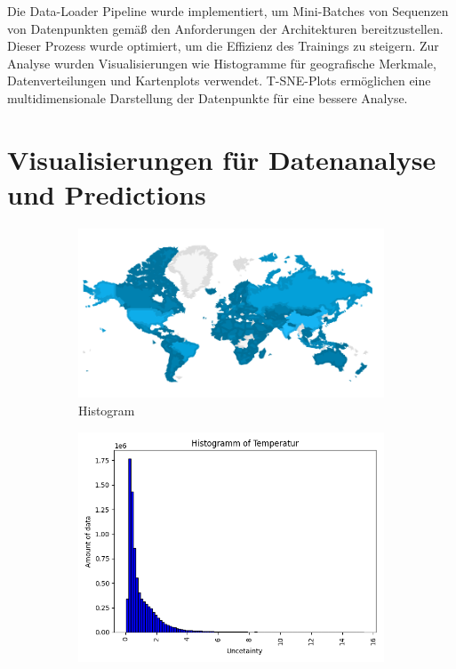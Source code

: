 \documentclass[manuscript,screen,review]{acmart}
\begin{document}
Die Data-Loader Pipeline wurde implementiert, um Mini-Batches von Sequenzen von Datenpunkten gemäß den Anforderungen der Architekturen bereitzustellen. Dieser Prozess wurde optimiert, um die Effizienz des Trainings zu steigern. 
Zur Analyse wurden Visualisierungen wie Histogramme für geografische Merkmale, Datenverteilungen und Kartenplots verwendet. 
T-SNE-Plots ermöglichen eine multidimensionale Darstellung der Datenpunkte für eine bessere Analyse.

\section{Visualisierungen für Datenanalyse und Predictions}

\begin{figure}[htp]
  \centering
  \begin{subfigure}{.45\textwidth}
      \centering
      \includegraphics[width=.8\linewidth]{./histograms/map_plot_data_points}
      \caption{Histogram}
      \label{fig:sub1}
  \end{subfigure}%
  \begin{subfigure}{.45\textwidth}
      \centering
      \includegraphics[width=.8\linewidth]{./histograms/Uncertainty}

\end{subfigure}
\end{figure}
\end{document}
